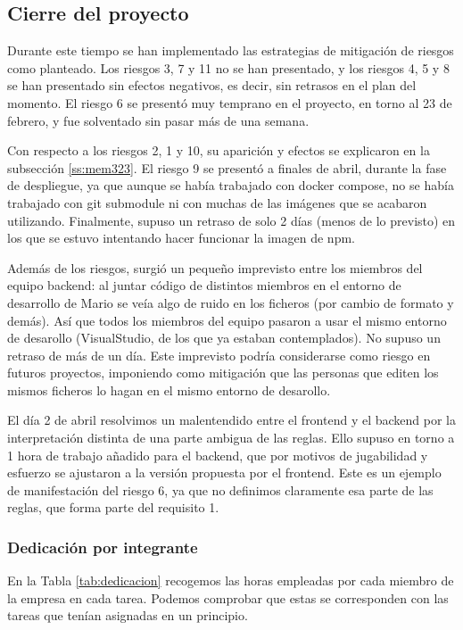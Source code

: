 \documentclass[11pt]{article}
\begin{document}
\subsection{Cierre del proyecto}
Durante este tiempo se han implementado las estrategias de mitigación de
riesgos como planteado. Los riesgos 3, 7 y 11 no se han
presentado, y los riesgos 4, 5 y 8 se han presentado sin efectos 
negativos, es decir, sin retrasos en el plan del momento. 
El riesgo 6 se presentó muy temprano en el proyecto, en torno
al 23 de febrero, y fue solventado sin pasar más de una semana. 

Con
respecto a los riesgos 2, 1 y 10, su aparición y efectos se explicaron en la
subsección \ref{ss:mem323}.
El riesgo 9 se presentó a finales de abril, durante la fase de despliegue,
ya que aunque se había trabajado con docker compose, no se había
trabajado con git submodule ni con muchas de las imágenes que se acabaron
utilizando. Finalmente, supuso un retraso de solo 2 días (menos de lo previsto)
en los que se estuvo intentando hacer funcionar la imagen de npm.

Además de los riesgos, surgió un pequeño imprevisto entre los miembros
del equipo backend: al juntar código de distintos miembros en el
entorno de desarrollo de Mario se veía algo de ruido en los ficheros
(por cambio de formato y demás). Así que todos los miembros del
equipo pasaron a usar el mismo entorno de desarollo (VisualStudio, de
los que ya estaban contemplados). 
No supuso un retraso de más de un día.
Este imprevisto podría considerarse
como riesgo en futuros proyectos, imponiendo como mitigación que las
personas que editen los mismos ficheros lo hagan en el mismo entorno
de desarollo. 

El día 2 de abril resolvimos un malentendido entre el frontend y el backend
por la interpretación distinta de una parte ambigua de las reglas. Ello
supuso en torno a 1 hora de trabajo añadido para el backend, que por motivos
de jugabilidad y esfuerzo se ajustaron a la versión propuesta por el frontend.
Este es un ejemplo de manifestación del riesgo 6, ya que no definimos claramente
esa parte de las reglas, que forma parte del requisito 1.

\subsubsection{Dedicación por integrante} 
En la Tabla \ref{tab:dedicacion} recogemos las horas empleadas por cada
miembro de la empresa en cada tarea. Podemos comprobar que estas se
corresponden con las tareas que tenían asignadas en un principio.
\end{document}
